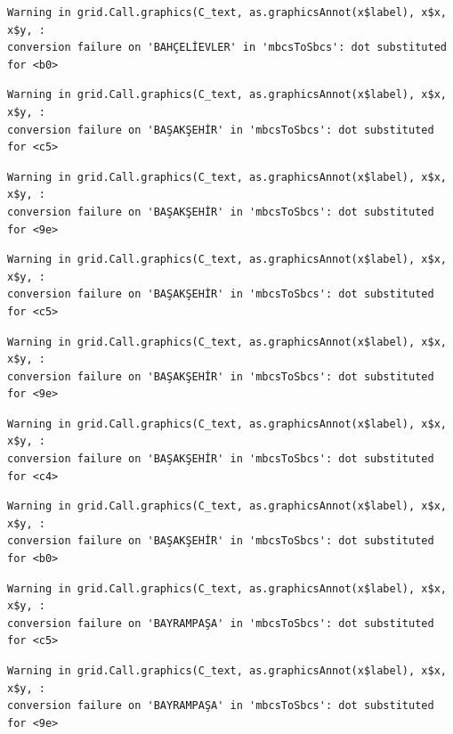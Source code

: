 \documentclass[
  11pt,
  a4paper,
  DIV=11,
  numbers=noendperiod]{scrartcl}
\begin{document}
\begin{verbatim}
Warning in grid.Call.graphics(C_text, as.graphicsAnnot(x$label), x$x, x$y, :
conversion failure on 'BAHÇELİEVLER' in 'mbcsToSbcs': dot substituted for <b0>
\end{verbatim}

\begin{verbatim}
Warning in grid.Call.graphics(C_text, as.graphicsAnnot(x$label), x$x, x$y, :
conversion failure on 'BAŞAKŞEHİR' in 'mbcsToSbcs': dot substituted for <c5>
\end{verbatim}

\begin{verbatim}
Warning in grid.Call.graphics(C_text, as.graphicsAnnot(x$label), x$x, x$y, :
conversion failure on 'BAŞAKŞEHİR' in 'mbcsToSbcs': dot substituted for <9e>
\end{verbatim}

\begin{verbatim}
Warning in grid.Call.graphics(C_text, as.graphicsAnnot(x$label), x$x, x$y, :
conversion failure on 'BAŞAKŞEHİR' in 'mbcsToSbcs': dot substituted for <c5>
\end{verbatim}

\begin{verbatim}
Warning in grid.Call.graphics(C_text, as.graphicsAnnot(x$label), x$x, x$y, :
conversion failure on 'BAŞAKŞEHİR' in 'mbcsToSbcs': dot substituted for <9e>
\end{verbatim}

\begin{verbatim}
Warning in grid.Call.graphics(C_text, as.graphicsAnnot(x$label), x$x, x$y, :
conversion failure on 'BAŞAKŞEHİR' in 'mbcsToSbcs': dot substituted for <c4>
\end{verbatim}

\begin{verbatim}
Warning in grid.Call.graphics(C_text, as.graphicsAnnot(x$label), x$x, x$y, :
conversion failure on 'BAŞAKŞEHİR' in 'mbcsToSbcs': dot substituted for <b0>
\end{verbatim}

\begin{verbatim}
Warning in grid.Call.graphics(C_text, as.graphicsAnnot(x$label), x$x, x$y, :
conversion failure on 'BAYRAMPAŞA' in 'mbcsToSbcs': dot substituted for <c5>
\end{verbatim}

\begin{verbatim}
Warning in grid.Call.graphics(C_text, as.graphicsAnnot(x$label), x$x, x$y, :
conversion failure on 'BAYRAMPAŞA' in 'mbcsToSbcs': dot substituted for <9e>
\end{verbatim}
\end{document}
